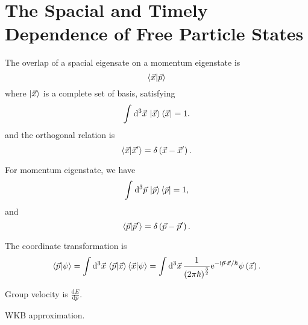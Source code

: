 
\section[自由粒子态的时空依赖]{The Spacial and Timely Dependence of Free Particle States}

The overlap of a spacial eigensate on a momentum eigenstate is
\begin{equation}
  \bra{\vec{x}} \ket{\vec{p}}
\end{equation}
where $\ket{\vec{x}}$ is a complete set of basis, satisfying
\begin{equation}
  \int_{}^{} \mathrm{d}^{3}\vec{x} \, \ket{\vec{x}}\bra{\vec{x}} = 1.
\end{equation}
and the orthogonal relation is
\begin{equation}
    \bra{\vec{x}} \ket{\vec{x}'} = \delta \left( \vec{x} - \vec{x}' \right) .
\end{equation}

For momentum eigenstate, we have
\begin{equation}
  \int_{}^{} \mathrm{d}^{3}\vec{p} \, \ket{\vec{p}} \bra{\vec{p}} = 1,
\end{equation}
and
\begin{equation}
    \bra{\vec{p}} \ket{\vec{p}'} = \delta \left( \vec{p} - \vec{p}' \right) .
\end{equation}

The coordinate transformation is
\begin{equation}
  \bra{\vec{p}} \ket{\psi} = \int \mathrm{d}^{3}\vec{x} \, \bra{\vec{p}} \ket{\vec{x}} \bra{\vec{x}} \ket{\psi} = \int \mathrm{d}^{3}\vec{x} \, \frac{1}{\left( 2\pi\hbar \right) ^{\frac{3}{2}}} \mathrm{e}^{- \mathrm{i} \vec{p}\cdot \vec{x} / \hbar} \psi \left( \vec{x} \right) .
\end{equation}

Group velocity is $\frac{\mathrm{d}E}{\mathrm{d} p}$.

WKB approximation.